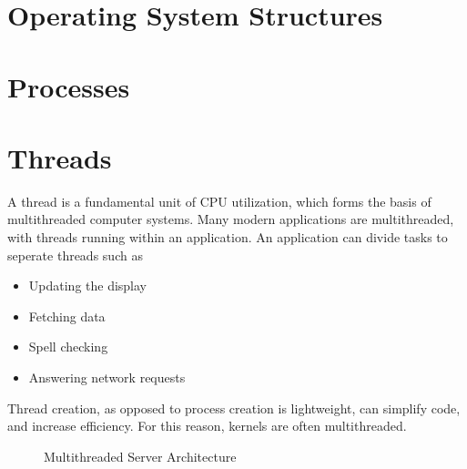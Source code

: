 \documentclass[oneside]{book}
\begin{document}
    \chapter{Operating System Structures}
    \chapter{Processes}
    \chapter{Threads}
            A thread is a fundamental unit of CPU utilization, which forms the basis of multithreaded computer systems.
            Many modern applications are multithreaded, with threads running within an application. An application can divide tasks to seperate threads
            such as
            \begin{itemize}
                \item Updating the display
                \item Fetching data
                \item Spell checking
                \item Answering network requests
            \end{itemize}
            Thread creation, as opposed to process creation is lightweight, can simplify code, and increase efficiency. For this reason, kernels are often
            multithreaded.
            \begin{figure}[H]
                \centering
                \caption{Multithreaded Server Architecture}
            \end{figure}
\end{document}
